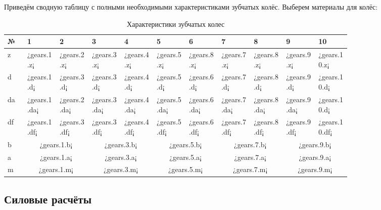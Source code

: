 \documentclass[14pt,a4paper,russian]{scrartcl}
\begin{document}
        Приведём сводную таблицу с полными необходимыми характеристиками зубчатых колёс.
        Выберем материалы для колёс:
        \begin{table}[h!]
            \begin{center}
                \begin{tabular}{p{0.04\linewidth}|p{0.075\linewidth}p{0.075\linewidth}p{0.075\linewidth}p{0.075\linewidth}p{0.075\linewidth}p{0.075\linewidth}p{0.075\linewidth}p{0.075\linewidth}p{0.075\linewidth}p{0.075\linewidth}}
                    \hline
                    №   & 1&2&3&4&5&6&7&8&9&10\\
                    \hline
                    z & ¿gears.1.z¡ & ¿gears.2.z¡ & ¿gears.3.z¡ & ¿gears.4.z¡ & ¿gears.5.z¡ & ¿gears.8.z¡ & ¿gears.7.z¡ & ¿gears.8.z¡ & ¿gears.9.z¡ & ¿gears.10.z¡ \\
                    d & ¿gears.1.d¡ & ¿gears.3.d¡ & ¿gears.3.d¡ & ¿gears.4.d¡ & ¿gears.5.d¡ & ¿gears.6.d¡ & ¿gears.7.d¡ & ¿gears.8.d¡ & ¿gears.9.d¡ & ¿gears.10.d¡ \\
                    da & ¿gears.1.da¡ & ¿gears.2.da¡ & ¿gears.3.da¡ & ¿gears.4.da¡ & ¿gears.5.da¡ & ¿gears.6.da¡ & ¿gears.7.da¡ & ¿gears.8.da¡ & ¿gears.9.da¡ & ¿gears.10.d¡ \\
                    df & ¿gears.1.df¡ & ¿gears.3.df¡ & ¿gears.3.df¡ & ¿gears.4.df¡ & ¿gears.5.df¡ & ¿gears.6.df¡ & ¿gears.7.df¡ & ¿gears.8.df¡ & ¿gears.9.df¡ & ¿gears.10.df¡ \\
                    b & \multicolumn{2}{c}{¿gears.1.b¡} &  \multicolumn{2}{c}{¿gears.3.b¡} &  \multicolumn{2}{c}{¿gears.5.b¡} & \multicolumn{2}{c}{¿gears.7.b¡} &\multicolumn{2}{c}{¿gears.9.b¡} \\
                    a & \multicolumn{2}{c}{¿gears.1.a¡} & \multicolumn{2}{c}{¿gears.3.a¡} & \multicolumn{2}{c}{¿gears.5.a¡} & \multicolumn{2}{c}{¿gears.7.a¡} & \multicolumn{2}{c}{¿gears.9.a¡} \\
                    m & \multicolumn{2}{c}{¿gears.1.m¡} & \multicolumn{2}{c}{¿gears.3.m¡} & \multicolumn{2}{c}{¿gears.5.m¡} & \multicolumn{2}{c}{¿gears.7.m¡} & \multicolumn{2}{c}{¿gears.9.m¡} \\
                    \hline
                \end{tabular}
                \caption{{Характеристики зубчатых колес}}\label{tab:gears_digest}
            \end{center}
        \end{table}

    
\subsection{Силовые расчёты}
\end{document}
